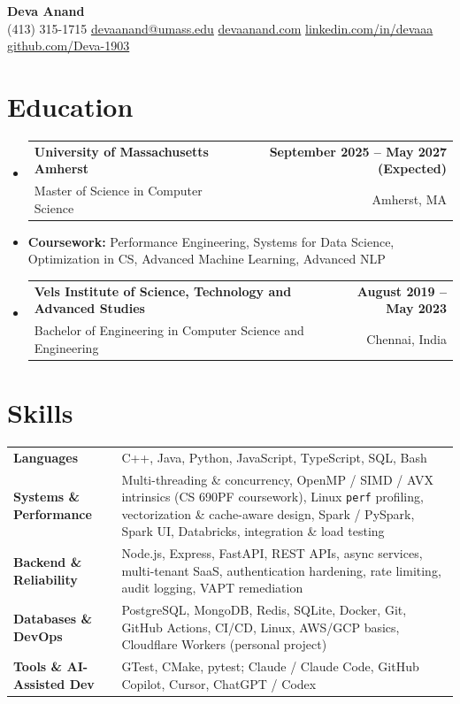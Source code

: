 \documentclass[letterpaper,10pt]{article}
\makeatletter
\newcommand{\resumeSubheading}[4]{
  \vspace{1pt}\item
    \begin{tabular*}{0.985\textwidth}[t]{l@{\extracolsep{\fill}}r}
      \textbf{#1} & \textbf{\small #2} \\
      {\small\color{ResumeSlate} #3} & {\small\color{ResumeSlate} #4} \\
    \end{tabular*}\vspace{-6pt}
}
\newcommand{\resumeSubItem}[1]{\item[]\small{#1\vspace{-1pt}}}
\newcommand{\resumeSubHeadingListStart}{\begin{itemize}[leftmargin=0.0in, label={}, itemsep=2pt, topsep=2pt]}
\newcommand{\resumeSubHeadingListEnd}{\end{itemize}}
\makeatother
\begin{document}
\begin{center}
    {\LARGE \bfseries \textcolor{ResumeNavy}{Deva Anand}} \\ \vspace{4pt}
    \small
    (413) 315-1715 \enspace\textbar\enspace
    \href{mailto:devaanand@umass.edu}{devaanand@umass.edu} \enspace\textbar\enspace
    \href{https://devaanand.com}{devaanand.com} \enspace\textbar\enspace
    \href{https://linkedin.com/in/devaaa/}{linkedin.com/in/devaaa} \enspace\textbar\enspace
    \href{https://github.com/Deva-1903}{github.com/Deva-1903}
    \vspace{-6pt}
\end{center}
\section{Education}
\resumeSubHeadingListStart
  \resumeSubheading
    {University of Massachusetts Amherst}{September 2025 -- May 2027 (Expected)}
    {Master of Science in Computer Science}{Amherst, MA}
  \resumeSubItem{\textbf{Coursework:} Performance Engineering, Systems for Data Science, Optimization in CS, Advanced Machine Learning, Advanced NLP}
  \resumeSubheading
    {Vels Institute of Science, Technology and Advanced Studies}{August 2019 -- May 2023}
    {Bachelor of Engineering in Computer Science and Engineering}{Chennai, India}
\resumeSubHeadingListEnd
\vspace{-4pt}
\section{Skills}
{\small
\begin{tabularx}{0.985\textwidth}{@{}>{\bfseries}p{1.36in}@{\hspace{0.45em}}X@{}}
  Languages & C++, Java, Python, JavaScript, TypeScript, SQL, Bash \\
  Systems \& Performance & Multi-threading \& concurrency, OpenMP / SIMD / AVX intrinsics (CS 690PF coursework), Linux \texttt{perf} profiling, vectorization \& cache-aware design, Spark / PySpark, Spark UI, Databricks, integration \& load testing \\
  Backend \& Reliability & Node.js, Express, FastAPI, REST APIs, async services, multi-tenant SaaS, authentication hardening, rate limiting, audit logging, VAPT remediation \\
  Databases \& DevOps & PostgreSQL, MongoDB, Redis, SQLite, Docker, Git, GitHub Actions, CI/CD, Linux, AWS/GCP basics, Cloudflare Workers (personal project) \\
  Tools \& AI-Assisted Dev & GTest, CMake, pytest; Claude / Claude Code, GitHub Copilot, Cursor, ChatGPT / Codex \\
\end{tabularx}
}
\vspace{-4pt}
\end{document}

